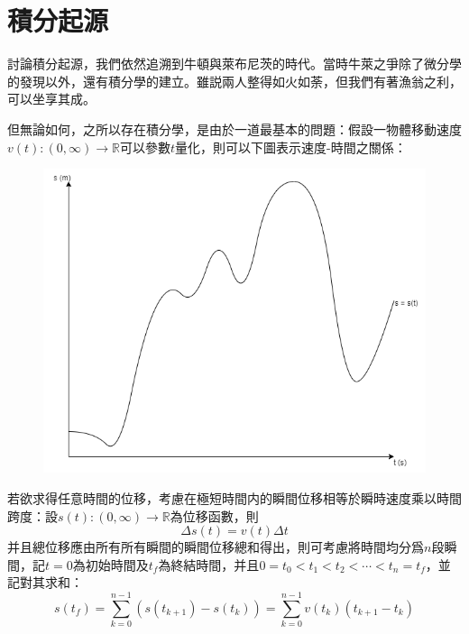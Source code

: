 \documentclass[12pt]{article}
\begin{document}
    \section*{積分起源}

    討論積分起源，我們依然追溯到牛頓與萊布尼茨的時代。當時牛萊之爭除了微分學的發現以外，還有積分學的建立。雖説兩人整得如火如荼，但我們有著漁翁之利，可以坐享其成。

    但無論如何，之所以存在積分學，是由於一道最基本的問題：假設一物體移動速度$v(t):(0,\infty)\to\mathbb{R}$可以參數$t$量化，則可以下圖表示速度-時間之關係：

    \begin{figure}[H]
        \centering
        \includegraphics[scale=0.6]{s-t graph.png}
    \end{figure}

    若欲求得任意時間的位移，考慮在極短時間内的瞬間位移相等於瞬時速度乘以時間跨度：設$s(t):(0,\infty)\to\mathbb{R}$為位移函數，則$$\Delta s(t)=v(t)\Delta t$$ 并且總位移應由所有所有瞬間的瞬間位移總和得出，則可考慮將時間均分爲$n$段瞬間，記$t=0$為初始時間及$t_f$為終結時間，并且$0=t_0<t_1<t_2<\cdots<t_n=t_f$，並記對其求和：$$s(t_f)=\sum_{k=0}^{n-1}(s(t_{k+1})-s(t_k))=\sum_{k=0}^{n-1}v(t_k)(t_{k+1}-t_k)$$
    
\end{document}

